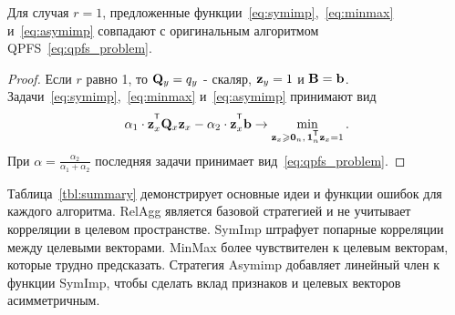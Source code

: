 \begin{statement}
	Для случая $r=1$, предложенные функции~\eqref{eq:symimp},~\eqref{eq:minmax} и~\eqref{eq:asymimp} совпадают с оригинальным алгоритмом QPFS~\eqref{eq:qpfs_problem}.
	
	\begin{proof}
		Если $r$ равно 1, то $\mathbf{Q}_y = q_y$ - скаляр, $\mathbf{z}_y = 1$ и $\mathbf{B} = \mathbf{b}$. Задачи~\eqref{eq:symimp},~\eqref{eq:minmax} и~\eqref{eq:asymimp} принимают вид
		\begin{equation*}
		\alpha_1 \cdot \bz_x^{\T} \bQ_x \bz_x - \alpha_2 \cdot \bz_x^{\T} \bb \rightarrow \min_{\bz_x \geq \bZero_n, \, \bOne_n^{\T}\bz_x=1} .
		\end{equation*}
		При $\alpha = \frac{\alpha_2}{\alpha_1 + \alpha_2}$ последняя задачи принимает вид~\eqref{eq:qpfs_problem}.
	\end{proof}
\end{statement}

Таблица~\ref{tbl:summary} демонстрирует основные идеи и функции ошибок для каждого алгоритма. 
RelAgg является базовой стратегией и не учитывает корреляции в целевом пространстве.
SymImp штрафует попарные корреляции между целевыми векторами.
MinMax более чувствителен к целевым векторам, которые трудно предсказать.
Стратегия Asymimp добавляет линейный член к функции SymImp, чтобы сделать вклад признаков и целевых векторов асимметричным.

